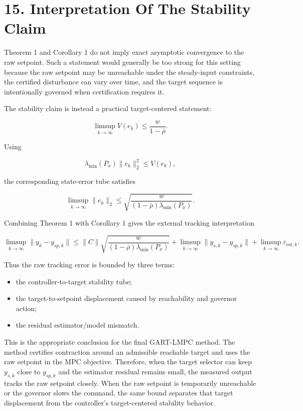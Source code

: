 \documentclass[11pt]{article}
\begin{document}
\section*{15. Interpretation Of The Stability Claim}

Theorem 1 and Corollary 1 do not imply exact asymptotic convergence to the raw setpoint. Such a statement would generally be too strong for this setting because the raw setpoint may be unreachable under the steady-input constraints, the certified disturbance can vary over time, and the target sequence is intentionally governed when certification requires it.


The stability claim is instead a practical target-centered statement:


\[
\limsup_{k\to\infty}V(e_k)
\le
\frac{w}{1-\bar\rho}.
\]

Using


\[
\lambda_{\min}(P_x)\|e_k\|_2^2
\le
V(e_k),
\]

the corresponding state-error tube satisfies


\[
\limsup_{k\to\infty}\|e_k\|_2
\le
\sqrt{
\frac{w}{(1-\bar\rho)\lambda_{\min}(P_x)}
}.
\]

Combining Theorem 1 with Corollary 1 gives the external tracking interpretation


\[
\limsup_{k\to\infty}\|y_k-y_{sp,k}\|
\le
\|C\|
\sqrt{
\frac{w}{(1-\bar\rho)\lambda_{\min}(P_x)}
}
+
\limsup_{k\to\infty}\|y_{s,k}-y_{sp,k}\|
+
\limsup_{k\to\infty}\varepsilon_{\mathrm{est},k}.
\]

Thus the raw tracking error is bounded by three terms:


\begin{itemize}
\item the controller-to-target stability tube;
\item the target-to-setpoint displacement caused by reachability and governor action;
\item the residual estimator/model mismatch.
\end{itemize}

This is the appropriate conclusion for the final GART-LMPC method. The method certifies contraction around an admissible reachable target and uses the raw setpoint in the MPC objective. Therefore, when the target selector can keep $y_{s,k}$ close to $y_{sp,k}$ and the estimator residual remains small, the measured output tracks the raw setpoint closely. When the raw setpoint is temporarily unreachable or the governor slows the command, the same bound separates that target displacement from the controller's target-centered stability behavior.
\end{document}
